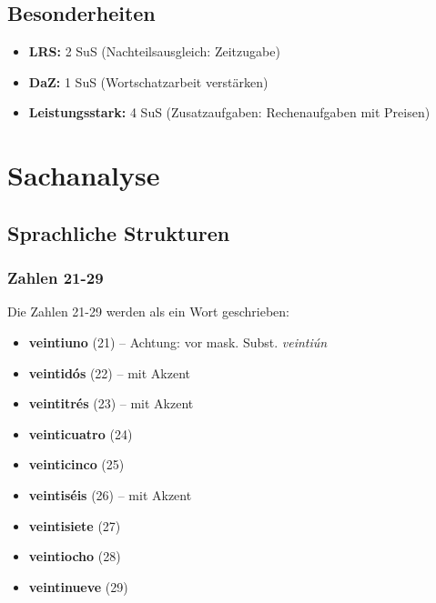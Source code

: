 \documentclass[11pt,a4paper]{article}
\begin{document}
\subsection{Besonderheiten}
\begin{itemize}
    \item \textbf{LRS:} 2 SuS (Nachteilsausgleich: Zeitzugabe)
    \item \textbf{DaZ:} 1 SuS (Wortschatzarbeit verstärken)
    \item \textbf{Leistungsstark:} 4 SuS (Zusatzaufgaben: Rechenaufgaben mit Preisen)
\end{itemize}

\section{Sachanalyse}

\subsection{Sprachliche Strukturen}

\subsubsection{Zahlen 21-29}
Die Zahlen 21-29 werden als ein Wort geschrieben:
\begin{itemize}
    \item \textbf{veintiuno} (21) -- Achtung: vor mask. Subst. \textit{veintiún}
    \item \textbf{veintidós} (22) -- mit Akzent
    \item \textbf{veintitrés} (23) -- mit Akzent
    \item \textbf{veinticuatro} (24)
    \item \textbf{veinticinco} (25)
    \item \textbf{veintiséis} (26) -- mit Akzent
    \item \textbf{veintisiete} (27)
    \item \textbf{veintiocho} (28)
    \item \textbf{veintinueve} (29)
\end{itemize}
\end{document}
